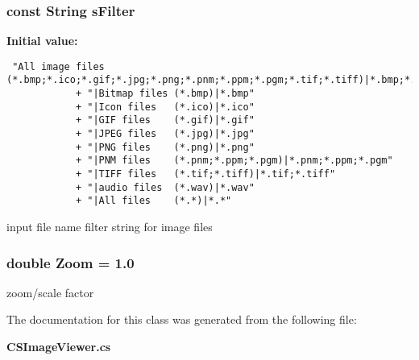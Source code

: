 \subsubsection{\setlength{\rightskip}{0pt plus 5cm}const String {\bf s\-Filter}\hspace{0.3cm}{\tt  [private]}}\label{class_c_s_image_viewer_1_1_c_s_image_viewer_424279d05bf6aa630d3da627a64ed746}


{\bf Initial value:}

\footnotesize\begin{verbatim} "All image files (*.bmp;*.ico;*.gif;*.jpg;*.png;*.pnm;*.ppm;*.pgm;*.tif;*.tiff)|*.bmp;*.ico;*.gif;*.jpg;*.png;*.pnm;*.ppm;*.pgm;*.tif;*.tiff"
            + "|Bitmap files (*.bmp)|*.bmp"
            + "|Icon files   (*.ico)|*.ico"
            + "|GIF files    (*.gif)|*.gif"
            + "|JPEG files   (*.jpg)|*.jpg"
            + "|PNG files    (*.png)|*.png"
            + "|PNM files    (*.pnm;*.ppm;*.pgm)|*.pnm;*.ppm;*.pgm"
            + "|TIFF files   (*.tif;*.tiff)|*.tif;*.tiff"
            + "|audio files  (*.wav)|*.wav"
            + "|All files    (*.*)|*.*"
\end{verbatim}\normalsize 
input file name filter string for image files 

\subsubsection{\setlength{\rightskip}{0pt plus 5cm}double {\bf Zoom} = 1.0\hspace{0.3cm}{\tt  [private]}}\label{class_c_s_image_viewer_1_1_c_s_image_viewer_0e089a5fee7fd471a09d154132e70d19}


zoom/scale factor 



The documentation for this class was generated from the following file:\begin{CompactItemize}
\item 
{\bf CSImage\-Viewer.cs}\end{CompactItemize}
